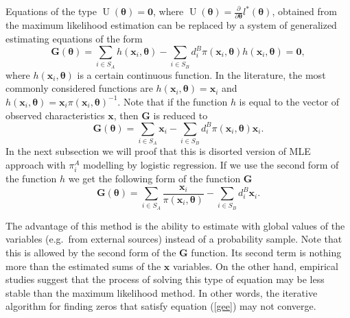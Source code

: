 \documentclass[
]{jss}
\begin{document}
Equations of the type
\(\operatorname{U}(\boldsymbol{\theta}) = \boldsymbol{0}\), where
\(\operatorname{U}(\boldsymbol{\theta}) = \frac{\partial}{\partial \boldsymbol{\theta}} l^*(\boldsymbol{\theta})\),
obtained from the maximum likelihood estimation can be replaced by a
system of generalized estimating equations of the form \begin{equation}
\label{gee}
\mathbf{G}(\boldsymbol{\theta})=\sum_{i \in S_A} h\left(\boldsymbol{x}_i, \boldsymbol{\theta}\right)-\sum_{i \in S_B} d_i^B \pi\left(\boldsymbol{x}_i, \boldsymbol{\theta}\right) h\left(\boldsymbol{x}_i, \boldsymbol{\theta}\right) = \boldsymbol{0},
\end{equation} where
\(h\left(\boldsymbol{x}_i, \boldsymbol{\theta}\right)\) is a certain
continuous function. In the literature, the most commonly considered
functions are
\(h\left(\boldsymbol{x}_i, \boldsymbol{\theta}\right) = \boldsymbol{x}_i\)
and
\(h\left(\boldsymbol{x}_i, \boldsymbol{\theta}\right) = \boldsymbol{x}_i \pi\left(\boldsymbol{x}_i, \boldsymbol{\theta}\right)^{-1}\).
Note that if the function \(h\) is equal to the vector of observed
characteristics \(\boldsymbol{x}\), then \(\mathbf{G}\) is reduced to \[
\mathbf{G}(\boldsymbol{\theta}) = \sum_{i \in S_A} \boldsymbol{x}_i-\sum_{i \in S_B} d_i^B \pi\left(\boldsymbol{x}_i, \boldsymbol{\theta}\right) \boldsymbol{x}_i.
\] In the next subsection we will proof that this is disorted version of
MLE approach with \(\pi_i^A\) modelling by logistic regression. If we
use the second form of the function \(h\) we get the following form of
the function \(\mathbf{G}\) \[
\mathbf{G}(\boldsymbol{\theta}) = \sum_{i \in S_A} \frac{\boldsymbol{x}_i}{\pi\left(\boldsymbol{x}_i, \boldsymbol{\theta}\right) }-\sum_{i \in S_B} d_i^B \boldsymbol{x}_i.
\]

The advantage of this method is the ability to estimate with global
values of the variables (e.g.~from external sources) instead of a
probability sample. Note that this is allowed by the second form of the
\(\mathbf{G}\) function. Its second term is nothing more than the
estimated sums of the \(\boldsymbol{x}\) variables. On the other hand,
empirical studies suggest that the process of solving this type of
equation may be less stable than the maximum likelihood method. In other
words, the iterative algorithm for finding zeros that satisfy equation
(\ref{gee}) may not converge.
\end{document}
